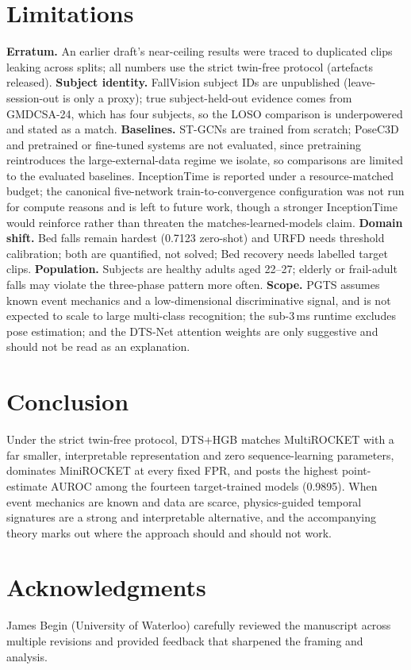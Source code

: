 \section{Limitations}
\textbf{Erratum.} An earlier draft's near-ceiling results were traced to duplicated clips leaking across splits; all numbers use the strict twin-free protocol (artefacts released). \textbf{Subject identity.} FallVision subject IDs are unpublished (leave-session-out is only a proxy); true subject-held-out evidence comes from GMDCSA-24, which has four subjects, so the LOSO comparison is underpowered and stated as a match. \textbf{Baselines.} ST-GCNs are trained from scratch; PoseC3D and pretrained or fine-tuned systems are not evaluated, since pretraining reintroduces the large-external-data regime we isolate, so comparisons are limited to the evaluated baselines. InceptionTime is reported under a resource-matched budget; the canonical five-network train-to-convergence configuration was not run for compute reasons and is left to future work, though a stronger InceptionTime would reinforce rather than threaten the matches-learned-models claim. \textbf{Domain shift.} Bed falls remain hardest (0.7123 zero-shot) and URFD needs threshold calibration; both are quantified, not solved; Bed recovery needs labelled target clips. \textbf{Population.} Subjects are healthy adults aged 22--27; elderly or frail-adult falls may violate the three-phase pattern more often. \textbf{Scope.} PGTS assumes known event mechanics and a low-dimensional discriminative signal, and is not expected to scale to large multi-class recognition; the sub-3\,ms runtime excludes pose estimation; and the DTS-Net attention weights are only suggestive and should not be read as an explanation.

\section{Conclusion}
Under the strict twin-free protocol, DTS+HGB matches MultiROCKET with a far smaller, interpretable representation and zero sequence-learning parameters, dominates MiniROCKET at every fixed FPR, and posts the highest point-estimate AUROC among the fourteen target-trained models (0.9895). When event mechanics are known and data are scarce, physics-guided temporal signatures are a strong and interpretable alternative, and the accompanying theory marks out where the approach should and should not work.

\ifnum{}
\section*{Acknowledgments}
James Begin (University of Waterloo) carefully reviewed the manuscript across multiple revisions and provided feedback that sharpened the framing and analysis.
\fi

